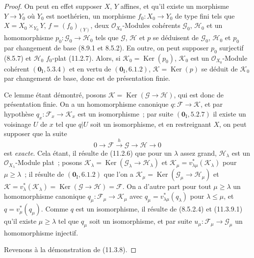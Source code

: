 \begin{proof}
On peut en effet supposer $X$, $Y$ affines, et qu'il existe un morphisme
$Y\to Y_0$ où $Y_0$ est noethérien, un morphisme $f_0:X_0\to Y_0$ de type fini
tels que $X=X_0\times_{Y_0}Y$, $f=(f_0)_{(Y)}$, deux
$\mathcal O_{X_0}$-Modules cohérents $\mathcal G_0$, $\mathcal H_0$ et un
homomorphisme $p_0:\mathcal G_0\to\mathcal H_0$ tels que $\mathcal G$,
$\mathcal H$ et $p$ se déduisent de $\mathcal G_0$, $\mathcal H_0$ et $p_0$ par
changement de base (8.9.1 et 8.5.2). En outre, on peut supposer $p_0$ surjectif
(8.5.7) et $\mathcal H_0$ $f_0$-plat (11.2.7). Alors, si
$\mathcal K_0=\operatorname{Ker}(p_0)$, $\mathcal K_0$ est un
$\mathcal O_{X_0}$-Module cohérent $(\mathbf 0_{\mathrm I},5.3.4)$ et en vertu
de $(\mathbf 0_{\mathrm I},6.1.2)$, $\mathcal K=\operatorname{Ker}(p)$ se déduit de
$\mathcal K_0$ par changement de base, donc est de présentation finie.

Ce lemme étant démontré, posons $\mathcal K=\operatorname{Ker}(\mathcal G\to\mathcal H)$,
qui est donc de présentation finie. On a un homomorphisme canonique
$q:\mathcal F\to\mathcal K$, et par hypothèse
$q_x:\mathcal F_x\to\mathcal K_x$ est un isomorphisme~; par suite
$(\mathbf 0_{\mathrm I},5.2.7)$ il existe un voisinage $U$ de $x$ tel que
$q|U$ soit un isomorphisme, et en restreignant $X$, on peut supposer que la
suite
\[
0\longrightarrow\mathcal F\xrightarrow{h}\mathcal G
\longrightarrow\mathcal H\longrightarrow0
\]
est \emph{exacte}. Cela étant, il résulte de (11.2.6) que pour un $\lambda$
assez grand, $\mathcal H_\lambda$ est un $\mathcal O_{X_\lambda}$-Module plat~;
posons $\mathcal K_\lambda=\operatorname{Ker}(\mathcal G_\lambda\to\mathcal H_\lambda)$ et
$\mathcal K_\mu=v_{\lambda\mu}^*(\mathcal K_\lambda)$ pour $\mu\geq\lambda$~;
il résulte de $(\mathbf 0_{\mathrm I},6.1.2)$ que l'on a
$\mathcal K_\mu=\operatorname{Ker}(\mathcal G_\mu\to\mathcal H_\mu)$ et
$\mathcal K=v_\lambda^*(\mathcal K_\lambda)
=\operatorname{Ker}(\mathcal G\to\mathcal H)=\mathcal F$. On a d'autre part pour tout
$\mu\geq\lambda$ un homomorphisme canonique
$q_\mu:\mathcal F_\mu\to\mathcal K_\mu$ avec
$q_\mu=v_{\lambda\mu}^*(q_\lambda)$ pour $\lambda\leq\mu$, et
$q=v_\mu^*(q_\mu)$. Comme $q$ est un isomorphisme, il résulte de (8.5.2.4) et
(11.3.9.1) qu'il existe $\mu\geq\lambda$ tel que $q_\mu$ soit un isomorphisme,
et par suite $u_\mu:\mathcal F_\mu\to\mathcal G_\mu$ un homomorphisme
injectif.

Revenons à la démonstration de (11.3.8).


\end{proof}
